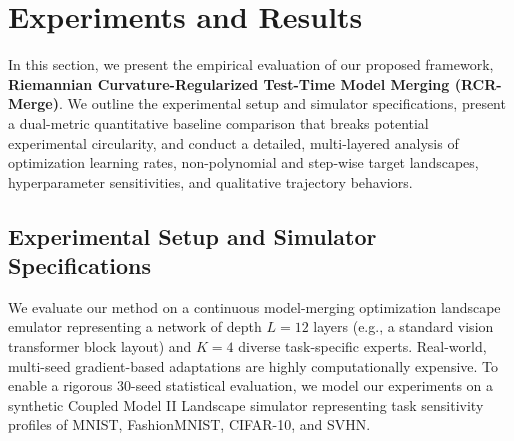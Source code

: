 \section{Experiments and Results}
\label{sec:experiments}

In this section, we present the empirical evaluation of our proposed framework, \textbf{Riemannian Curvature-Regularized Test-Time Model Merging (RCR-Merge)}. We outline the experimental setup and simulator specifications, present a dual-metric quantitative baseline comparison that breaks potential experimental circularity, and conduct a detailed, multi-layered analysis of optimization learning rates, non-polynomial and step-wise target landscapes, hyperparameter sensitivities, and qualitative trajectory behaviors.

\subsection{Experimental Setup and Simulator Specifications}
We evaluate our method on a continuous model-merging optimization landscape emulator representing a network of depth $L=12$ layers (e.g., a standard vision transformer block layout) and $K=4$ diverse task-specific experts. Real-world, multi-seed gradient-based adaptations are highly computationally expensive. To enable a rigorous 30-seed statistical evaluation, we model our experiments on a synthetic Coupled Model II Landscape simulator representing task sensitivity profiles of MNIST, FashionMNIST, CIFAR-10, and SVHN.

